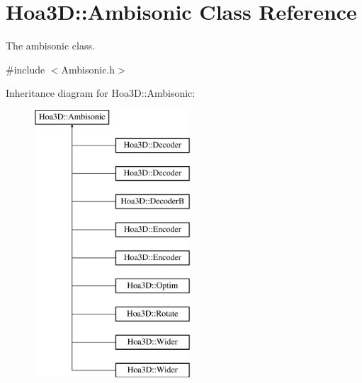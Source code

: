 \hypertarget{class_hoa3_d_1_1_ambisonic}{\section{Hoa3\-D\-:\-:Ambisonic Class Reference}
\label{class_hoa3_d_1_1_ambisonic}
}


The ambisonic class.  




{\ttfamily \#include $<$Ambisonic.\-h$>$}

Inheritance diagram for Hoa3\-D\-:\-:Ambisonic\-:\begin{figure}[H]
\begin{center}
\leavevmode
\includegraphics[height=10.000000cm]{class_hoa3_d_1_1_ambisonic}
\end{center}
\end{figure}
